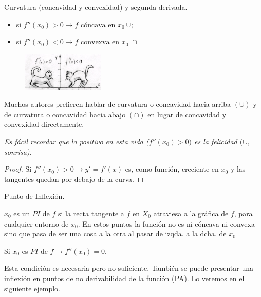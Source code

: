 	\begin{teor} Curvatura (concavidad y convexidad) y segunda derivada.
	\begin{multicols}{2}
		\begin{itemize} 
			\item si $f''(x_0)>0 \to f \mbox { cóncava en }  x_0 \ \cup; $
			\item si $f''(x_0)<0 \to f \mbox { convexva en }  x_0 \; \cap$
		\end{itemize}
		\begin{figure}[H]
		\centering
		\includegraphics[width=0.35\textwidth]{imagenes/imagenes05/xiste05.png}
		\end{figure}
	\end{multicols}
		
	\end{teor}
	Muchos autores prefieren hablar de curvatura o concavidad hacia arriba $(\cup)$ y de curvatura o concavidad hacia abajo $(\cap)$ en lugar de concavidad y convexidad directamente. 
	
	\emph{Es fácil recordar que lo positivo en esta vida ($f''(x_0)>0)$ es la felicidad $(\cup,\; $ sonrisa).}
	
	\begin{proof}
		Si $f''(x_0)>0 \to y'=f'(x)$ es, como función, creciente en $x_0$ y las tangentes quedan por debajo de la curva.
	\end{proof}

	
		
	

	
	\begin{defi} Punto de Inflexión.
	
	$x_0$ es un $PI$ de $f$ si la recta tangente a $f$ en $X_0$ atraviesa a la gráfica de $f$, para cualquier entorno de $x_0$. En estos puntos la función no es ni cóncava ni convexa sino que pasa de ser una cosa a la otra al pasar de izqda. a la dcha. de $x_0$
	\end{defi}
	
	
	
	\begin{teor} Si $x_0$ es $PI$ de $f \to f''(x_0)=0$.
	
	Esta condición es necesaria pero no suficiente. También se puede presentar una inflexión en puntos de no derivabilidad de la función (PA). Lo veremos en el siguiente ejemplo.
		
	\end{teor}
	
